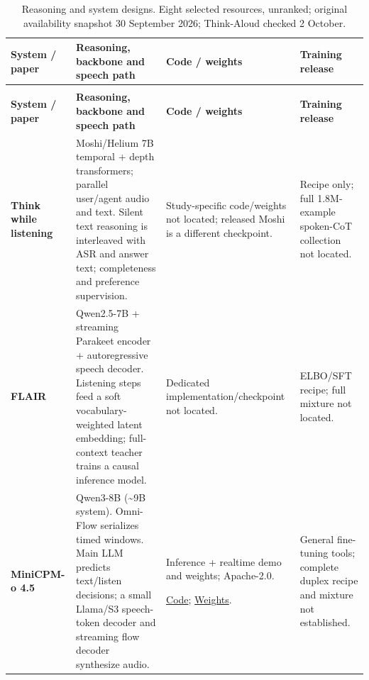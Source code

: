 \begingroup
\centering
\footnotesize
\setlength{\tabcolsep}{4pt}
\setlength{\tablewidth}{\dimexpr\linewidth-6\tabcolsep\relax}
\renewcommand{\arraystretch}{1.08}
\begin{longtable}{@{}>{\raggedright\arraybackslash}p{0.22\tablewidth}>{\raggedright\arraybackslash}p{0.43\tablewidth}>{\raggedright\arraybackslash}p{0.20\tablewidth}>{\raggedright\arraybackslash}p{0.15\tablewidth}@{}}
\caption{Reasoning and system designs. Eight selected resources, unranked; original availability snapshot 30 September 2026; Think-Aloud checked 2 October.}\label{tab:systems}\\
\toprule
\textbf{System / paper} & \textbf{Reasoning, backbone and speech path} & \textbf{Code / weights} & \textbf{Training release} \\
\midrule
\endfirsthead
\multicolumn{4}{l}{\textit{Table \thetable{} continued}}\\
\toprule
\textbf{System / paper} & \textbf{Reasoning, backbone and speech path} & \textbf{Code / weights} & \textbf{Training release} \\
\midrule
\endhead
\bottomrule
\endfoot
\bottomrule
\endlastfoot
\textbf{Think while listening}\par\citep{thinklisten} & Moshi/Helium 7B temporal + depth transformers; parallel user/agent audio and text. Silent text reasoning is interleaved with ASR and answer text; completeness and preference supervision. & Study-specific code/weights not located; released Moshi is a different checkpoint. & Recipe only; full 1.8M-example spoken-CoT collection not located. \\
\addlinespace[4pt]
\textbf{FLAIR}\par\citep{flair} & Qwen2.5-7B + streaming Parakeet encoder + autoregressive speech decoder. Listening steps feed a soft vocabulary-weighted latent embedding; full-context teacher trains a causal inference model. & Dedicated implementation/checkpoint not located. & ELBO/SFT recipe; full mixture not located. \\
\addlinespace[4pt]
\textbf{MiniCPM-o 4.5}\par\citep{minicpm} & Qwen3-8B (\textasciitilde{}9B system). Omni-Flow serializes timed windows. Main LLM predicts text/listen decisions; a small Llama/S3 speech-token decoder and streaming flow decoder synthesize audio. & Inference + realtime demo and weights; Apache-2.0.\par \href{https://github.com/OpenBMB/MiniCPM-V}{Code}; \href{https://huggingface.co/openbmb/MiniCPM-o-4_5}{Weights}. & General fine-tuning tools; complete duplex recipe and mixture not established. \\

\end{longtable}
